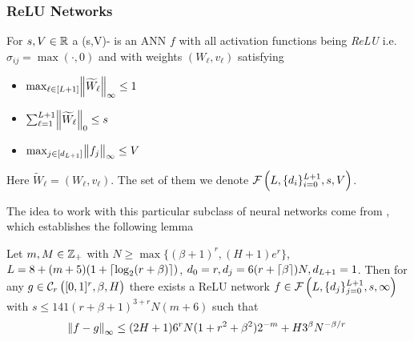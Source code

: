 \subsubsection{ReLU Networks}
\begin{defn}
  For $s,V \in \mathbb{R}$ a (s,V)- is an ANN $f$
  with all activation functions being \emph{ReLU}
  i.e. $\sigma_{ij} = \max(\cdot, 0)$
  and with weights $(W_\ell, v_\ell)$ satisfying
  \begin{multicols}{3}
    \begin{itemize}
      \item $\max_{\ell \in [L+1]} \norm{\widetilde{W}_\ell}_\infty \leq 1$
      \item $\sum_{\ell = 1}^{L+1} \norm{\widetilde{W}_\ell}_0 \leq s$
      \item $\max_{j \in [d_{L+1}]} \norm{f_j}_\infty \leq V$
    \end{itemize}
  \end{multicols}
  Here $\widetilde{W}_\ell = (W_\ell, v_\ell)$.
  The set of them we denote $\mathcal{F}\left(L, \{d_i\}_{i=0}^{L+1},s,V \right)$.
  \label{def:sparseReLU}
\end{defn}
The idea to work with this particular subclass of neural networks come from
, which establishes the following lemma

\begin{lem}
    Let $m,M \in \mathbb{Z}_+$ with $N \geq \max\{(\beta + 1)^r, (H + 1) e^r\}$,
    $L = 8 + (m + 5) (1 + \lceil\log_2(r + \beta)\rceil)$, 
    $d_0 = r, d_j = 6(r + \lceil\beta\rceil) N, d_{L+1} = 1$.
    Then for any $g \in \mathcal{C}_r \left( [0,1]^r, \beta, H \right)$
    there exists a ReLU network
    $f \in \mathcal{F}\left(L, \{d_j\}_{j=0}^{L+1}, s, \infty \right)$
    with $s \leq 141 (r + \beta + 1)^{3 + r} N (m+6)$
    such that
    \begin{equation*}
      \norm{f - g}_\infty \leq (2 H + 1) 6^r N (1 + r^2 + \beta^2) 2^{-m}
      + H 3^{\beta} N^{-\beta/r}
    \end{equation*}
    \label{lem:holderapprox} 
  \end{lem} 
  \vspace*{-\baselineskip}


